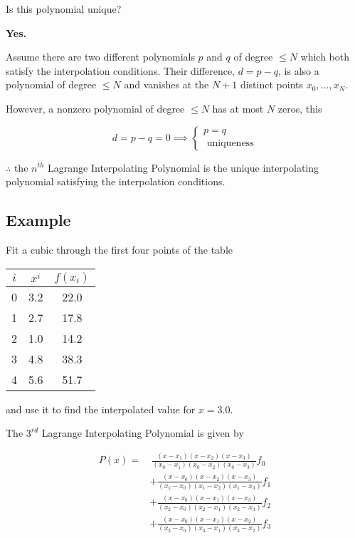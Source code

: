 Is this polynomial unique?

\textbf{Yes.} 

\proof Assume there are two different polynomials $p$ and $q$ of degree $\leq N$
which both satisfy the interpolation conditions. Their difference, $d=p-q$, is
also a polynomial of degree $\leq N$ and vanishes at the $N+1$ distinct points 
$x_0,\dots,x_N$.

However, a nonzero polynomial of degree $\leq N$ has at most $N$ zeros, this

\[
d = p-q = 0 \implies \begin{cases}
  p=q\\
  \text{ uniqueness}
\end{cases}
\]

$\therefore$ the $n^{th}$ Lagrange Interpolating Polynomial is the unique
interpolating polynomial satisfying the interpolation conditions.

\subsection{Example}

Fit a cubic through the first four points of the table 

\begin{table}[h]
    \centering
    \begin{tabular}{c|c|c}
        $i$ & $x^i$ & $f(x_i)$ \\
        \hline
        0 & 3.2 & 22.0 \\
        1 & 2.7 & 17.8 \\
        2 & 1.0 & 14.2 \\
        3 & 4.8 & 38.3 \\
        4 & 5.6 & 51.7 \\
    \end{tabular}
\end{table}

and use it to find the interpolated value for $x=3.0$.

\soln The $3^{rd}$ Lagrange Interpolating Polynomial is given by

\begin{align*}
    P(x) = &\ \frac{(x - x_1)(x - x_2)(x - x_3)}{(x_0 - x_1)(x_0 - x_2)(x_0 - x_3)} f_0 \\
    &+ \frac{(x - x_0)(x - x_2)(x - x_3)}{(x_1 - x_0)(x_1 - x_2)(x_1 - x_3)} f_1 \\
    &+ \frac{(x - x_0)(x - x_1)(x - x_3)}{(x_2 - x_0)(x_2 - x_1)(x_2 - x_3)} f_2 \\
    &+ \frac{(x - x_0)(x - x_1)(x - x_2)}{(x_3 - x_0)(x_3 - x_1)(x_3 - x_2)} f_3
\end{align*}

